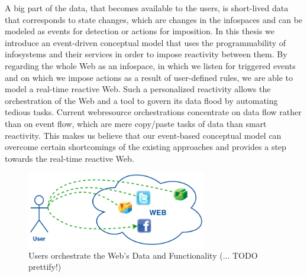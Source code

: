 A big part of the data, that becomes available to the users, is short-lived data that corresponds to state changes, which are changes in the \textrm{\glspl{infospace}} and can be modeled as events for detection or actions for imposition.
In this thesis we introduce an event-driven conceptual model that uses the programmability of \textrm{\glspl{infosystem}} and their services in order to impose reactivity between them.
By regarding the whole Web as an \textrm{\gls{infospace}}, in which we listen for triggered events and on which we impose actions as a result of user-defined rules, we are able to model a real-time reactive Web.
Such a personalized reactivity allows the orchestration of the Web and a tool to govern its data flood by automating tedious tasks.
Current \textrm{\gls{webresource}} orchestrations concentrate on data flow rather than on event flow, which are mere copy/paste tasks of data than smart reactivity.
This makes us believe that our event-based conceptual model can overcome certain shortcomings of the existing approaches and provides a step towards the real-time reactive Web.


\begin{figure}[!ht]
  \centering
  \includegraphics[width=0.7\textwidth]{figures/UsersWeildServicesInTheWeb}
  \caption{Users orchestrate the Web's Data and Functionality (... TODO prettify!)}
  \label{fig:UsersWeildServicesInTheWeb}
\end{figure}



